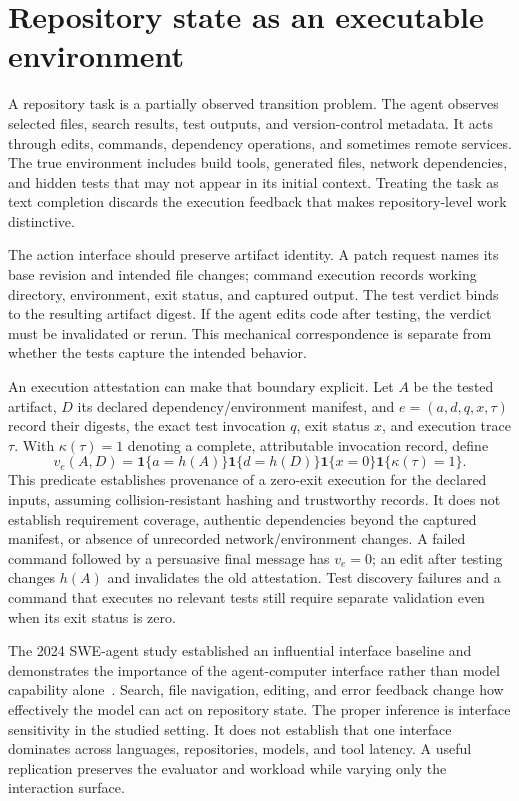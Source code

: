 \section{Repository state as an executable environment}\label{sec:C23:repository}
A repository task is a partially observed transition problem. The agent observes selected files, search results, test outputs, and version-control metadata. It acts through edits, commands, dependency operations, and sometimes remote services. The true environment includes build tools, generated files, network dependencies, and hidden tests that may not appear in its initial context. Treating the task as text completion discards the execution feedback that makes repository-level work distinctive.

The action interface should preserve artifact identity. A patch request names its base revision and intended file changes; command execution records working directory, environment, exit status, and captured output. The test verdict binds to the resulting artifact digest. If the agent edits code after testing, the verdict must be invalidated or rerun. This mechanical correspondence is separate from whether the tests capture the intended behavior.

An execution attestation can make that boundary explicit. Let $A$ be the tested artifact, $D$ its declared dependency/environment manifest, and $e=(a,d,q,x,\tau)$ record their digests, the exact test invocation $q$, exit status $x$, and execution trace $\tau$. With $\kappa(\tau)=1$ denoting a complete, attributable invocation record, define
\begin{equation}
 v_e(A,D)=\mathbf1\{a=h(A)\}\mathbf1\{d=h(D)\}
          \mathbf1\{x=0\}\mathbf1\{\kappa(\tau)=1\}.
 \label{eq:C23:artifact_attestation}
\end{equation}
This predicate establishes provenance of a zero-exit execution for the declared inputs, assuming collision-resistant hashing and trustworthy records. It does not establish requirement coverage, authentic dependencies beyond the captured manifest, or absence of unrecorded network/environment changes. A failed command followed by a persuasive final message has $v_e=0$; an edit after testing changes $h(A)$ and invalidates the old attestation. Test discovery failures and a command that executes no relevant tests still require separate validation even when its exit status is zero.

The 2024 SWE-agent study established an influential interface baseline and demonstrates the importance of the agent-computer interface rather than model capability alone~\cite{yang2024sweagent}. Search, file navigation, editing, and error feedback change how effectively the model can act on repository state. The proper inference is interface sensitivity in the studied setting. It does not establish that one interface dominates across languages, repositories, models, and tool latency. A useful replication preserves the evaluator and workload while varying only the interaction surface.

